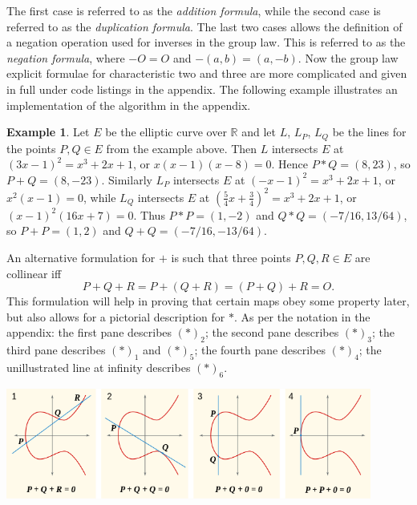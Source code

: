 \documentclass{article}
\newcommand{\R}{\mathbb{R}}
\newcommand{\rb}[1]{\left( #1 \right)}
\theoremstyle{definition}\newtheorem*{definition}{Definition}
\theoremstyle{definition}\newtheorem*{example}{Example}
\theoremstyle{definition}\newtheorem*{remark}{Remark}
\begin{document}
The first case is referred to as the \emph{addition formula}, while the second case is referred to as the \emph{duplication formula}. The last two cases allows the definition of a negation operation used for inverses in the group law. This is referred to as the \emph{negation formula}, where $ -O = O $ and $ -\rb{a, b} = \rb{a, -b} $. Now the group law explicit formulae for characteristic two and three are more complicated and given in full under code listings in the appendix. The following example illustrates an implementation of the algorithm in the appendix.

\begin{example}
Let $ E $ be the elliptic curve over $ \R $ and let $ L $, $ L_P $, $ L_Q $ be the lines for the points $ P, Q \in E $ from the example above. Then $ L $ intersects $ E $ at $ \rb{3x - 1}^2 = x^3 + 2x + 1 $, or $ x\rb{x - 1}\rb{x - 8} = 0 $. Hence $ P * Q = \rb{8, 23} $, so $ P + Q = \rb{8, -23} $. Similarly $ L_P $ intersects $ E $ at $ \rb{-x - 1}^2 = x^3 + 2x + 1 $, or $ x^2\rb{x - 1} = 0 $, while $ L_Q $ intersects $ E $ at $ \rb{\tfrac{5}{4}x + \tfrac{3}{4}}^2 = x^3 + 2x + 1 $, or $ \rb{x - 1}^2\rb{16x + 7} = 0 $. Thus $ P * P = \rb{1, -2} $ and $ Q * Q = \rb{-7 / 16, 13 / 64} $, so $ P + P = \rb{1, 2} $ and $ Q + Q = \rb{-7 / 16, -13 / 64} $.
\end{example}

An alternative formulation for $ + $ is such that three points $ P, Q, R \in E $ are collinear iff
$$ P + Q + R = P + \rb{Q + R} = \rb{P + Q} + R = O. $$
This formulation will help in proving that certain maps obey some property later, but also allows for a pictorial description for $ * $. As per the notation in the appendix: the first pane describes $ \rb{*}_2 $; the second pane describes $ \rb{*}_3 $; the third pane describes $ \rb{*}_1 $ and $ \rb{*}_5 $; the fourth pane describes $ \rb{*}_4 $; the unillustrated line at infinity describes $ \rb{*}_6 $.
\begin{center}
\includegraphics*[width=0.9\textwidth]{img/ECClines.png}
\end{center}

\pagebreak
\end{document}
